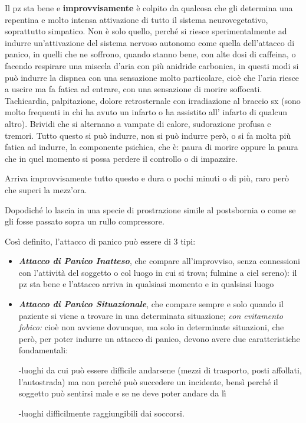 \documentclass[]{article}
\begin{document}
Il pz sta bene e \textbf{improvvisamente} è colpito da qualcosa che gli
determina una repentina e molto intensa attivazione di tutto il sistema
neurovegetativo, soprattutto simpatico. Non è solo quello, perché si
riesce sperimentalmente ad indurre un'attivazione del sistema nervoso
autonomo come quella dell'attacco di panico, in quelli che ne soffrono,
quando stanno bene, con alte dosi di caffeina, o facendo respirare una
miscela d'aria con più anidride carbonica, in questi modi si può indurre
la dispnea con una sensazione molto particolare, cioè che l'aria riesce
a uscire ma fa fatica ad entrare, con una sensazione di morire
soffocati. Tachicardia, palpitazione, dolore retrosternale con
irradiazione al braccio sx (sono molto frequenti in chi ha avuto un
infarto o ha assistito all' infarto di qualcun altro). Brividi che si
alternano a vampate di calore, sudorazione profusa e tremori. Tutto
questo si può indurre, non si può indurre però, o si fa molta più fatica
ad indurre, la componente psichica, che è: paura di morire oppure la
paura che in quel momento si possa perdere il controllo o di impazzire.

Arriva improvvisamente tutto questo e dura o pochi minuti o di più, raro
però che superi la mezz'ora.

Dopodiché lo lascia in una specie di prostrazione simile al postsbornia
o come se gli fosse passato sopra un rullo compressore.

Così definito, l'attacco di panico può essere di 3 tipi:

\begin{itemize}
\item
  \textbf{\emph{Attacco di Panico Inatteso}}, che compare
  all'improvviso, senza connessioni con l'attività del soggetto o col
  luogo in cui si trova; fulmine a ciel sereno): il pz sta bene e
  l'attacco arriva in qualsiasi momento e in qualsiasi luogo
\item
  \textbf{\emph{Attacco di Panico Situazionale}}, che compare sempre e
  solo quando il paziente si viene a trovare in una determinata
  situazione; \emph{con evitamento fobico:} cioè non avviene dovunque,
  ma solo in determinate situazioni, che però, per poter indurre un
  attacco di panico, devono avere due caratteristiche fondamentali:

  -luoghi da cui può essere difficile andarsene (mezzi di trasporto,
  posti affollati, l'autostrada) ma non perché può succedere un
  incidente, bensì perché il soggetto può sentirsi male e se ne deve
  poter andare da lì

  -luoghi difficilmente raggiungibili dai soccorsi.
\end{itemize}
\end{document}
